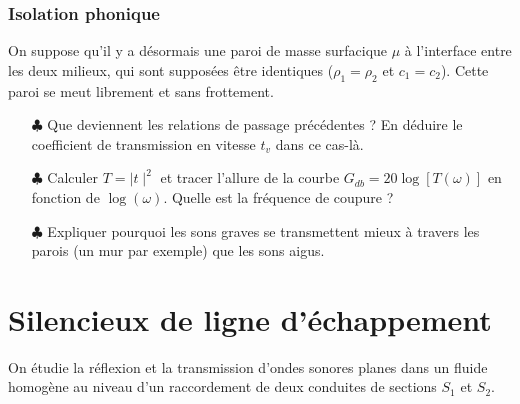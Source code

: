 \documentclass{report}
\begin{document}
\subsubsection*{Isolation phonique}

On suppose qu'il y a désormais une paroi de masse surfacique $\mu$ à l'interface entre les deux milieux, qui sont supposées être identiques ($\rho_1=\rho_2$ et $c_1=c_2$). Cette paroi se meut librement et sans frottement. 

\begin{itemize}
	
	\item[$\clubsuit$] Que deviennent les relations de passage précédentes ? En déduire le coefficient de transmission en vitesse $t_v$ dans ce cas-là. 
	
	\item[$\clubsuit$] Calculer $T=\mid t\mid^2$ et tracer l'allure de la courbe $G_{db}=20\log\left[T(\omega) \right]$ en fonction de $\log(\omega)$. Quelle est la fréquence de coupure ?
	
	\item[$\clubsuit$] Expliquer pourquoi les sons graves se transmettent mieux à travers les parois (un mur par exemple) que les sons aigus.
	
\end{itemize}

\newpage

\section*{Silencieux de ligne d'échappement}

On étudie la réflexion et la transmission d'ondes sonores planes dans un fluide homogène au niveau d'un raccordement  de deux conduites de sections $S_1$ et $S_2$. 
\end{document}
